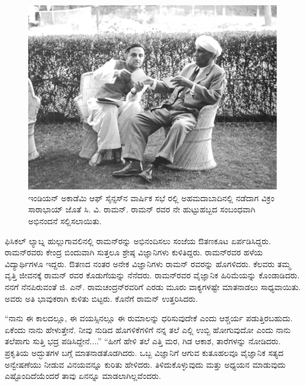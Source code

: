 \begin{figure}
\includegraphics{"images/11.jpg"}
\caption{ಇಂಡಿಯನ್ ಅಕಾಡೆಮಿ ಆಫ್ ಸೈನ್ಸಸ್‍ನ ವಾರ್ಷಿಕ ಸಭೆ ರಲ್ಲಿ ಅಹಮದಾಬಾದಿನಲ್ಲಿ ನಡೆದಾಗ ವಿಕ್ರಂ ಸಾರಾಭಾಯ್ ಜೊತೆ ಸಿ. ವಿ. ರಾಮನ್. ರಾಮನ್ ರವರ ನೇ ಹುಟ್ಟುಹಬ್ಬದ ಸಂಬಂಧವಾಗಿ ಅಭಿನಂದನೆ ಸಲ್ಲಿಸಲಾಯಿತು.}
\end{figure}

ಫಿಸಿಕಲ್ ಲ್ಯಾಬ್ನ ಹುಲ್ಲುಗಾವಲಿನಲ್ಲಿ ರಾಮನ್‍ರನ್ನು ಅಭಿನಂದಿಸಲು ಸಂಜೆಯ ಔತಣಕೂಟ ಏರ್ಪಡಿಸಿದ್ದರು. ರಾಮನ್‍ರವರು ಕೇಂದ್ರ ಬಿಂದುವಾಗಿ ಸುತ್ತಲೂ ಶ್ರೇಷ್ಠ ವಿಜ್ಞಾನಿಗಳು ಕುಳಿತಿದ್ದರು. ರಾಮನ್‍ರವರ ಹಳೆಯ ವಿದ್ಯಾರ್ಥಿಗಳೂ ಇದ್ದರು. ಔತಣದ ನಂತರ ಅನೇಕ ವಿಜ್ಞಾನಿಗಳು ರಾಮನ್ ರವರನ್ನು ಹೊಗಳಿದರು. ಕೆಲವರು ತಮ್ಮ ವೃತ್ತಿ ಜೀವನಕ್ಕೆ ರಾಮನ್ ರವರ ಕೊಡುಗೆಯನ್ನು ನೆನೆದರು. ರಾಮನ್‍ರವರ ವೈಜ್ಞಾನಿಕ ಹಿರಿಮೆಯನ್ನು ಕೊಂಡಾಡಿದರು. ನನಗೆ ನೆನಪಿರುವಂತೆ ಜಿ. ಎನ್. ರಾಮಚಂದ್ರನ್‍ರವರಿಗೆ ಎರಡು ಮೂರು ವಾಕ್ಯಗಳಷ್ಟೇ ಮಾತನಾಡಲು ಸಾಧ್ಯವಾಯಿತು. ಅವರು ಅತಿ ಭಾವುಕರಾಗಿ ಕುಳಿತು ಬಿಟ್ಟರು. ಕೊನೆಗೆ ರಾಮನ್ ಉತ್ತರಿಸಿದರು.

 \enginline{-}“ನಾನು ಈ ಕಾಲದಲ್ಲೂ, ಈ ವಯಸ್ಸಿನಲ್ಲೂ ಈ ರುಮಾಲನ್ನು ಧರಿಸುವುದೇಕೆ ಎಂದು ಆಶ್ಚರ್ಯ ಪಡುತ್ತಿರಬಹುದು. ಏಕೆಂದು ನಾನು ಹೇಳುತ್ತೇನೆ. ನೀವು ನುಡಿದ ಹೊಗಳಿಕೆಗಳಿಗೆ ನನ್ನ ತಲೆ ಎಲ್ಲಿ ಉಬ್ಬಿ ಹೋಗುವುದೋ ಎಂದು ನಾನು ತಲೆಪಾಗು ಸುತ್ತಿ ಭದ್ರ ಪಡಿಸಿದ್ದೇನೆ....” “ಹೀಗೆ ಹೇಳಿ ತಲೆ ಎತ್ತಿ ಮರ, ಗಿಡ ಆಕಾಶ, ತಾರೆಗಳನ್ನು ನೋಡಿದರು. ಪ್ರಕೃತಿಯ ಅದ್ಭುತಗಳ ಬಗ್ಗೆ ಮಾತನಾಡತೊಡಗಿದರು. ಒಬ್ಬ ವಿಜ್ಞಾನಿಗೆ ಆಗುವ ಕುತೂಹಲವೂ ವೈಜ್ಞಾನಿಕ ಸತ್ಯದ ಅನ್ವೇಷಣೆಯು ನೀಡುವ ವಿನಯವನ್ನೂ ಕುರಿತು ಹೇಳಿದರು. ತಿಳಿದುಕೊಳ್ಳುವುದು ಮತ್ತು ಅಧ್ಯಯನ ಮಾಡುವುದು ಎಷ್ಟೊಂದಿದೆಯೆಂದರೆ ತಾವು ಏನನ್ನೂ ಮಾಡಲಾಗಿಲ್ಲವೆಂದರು.

